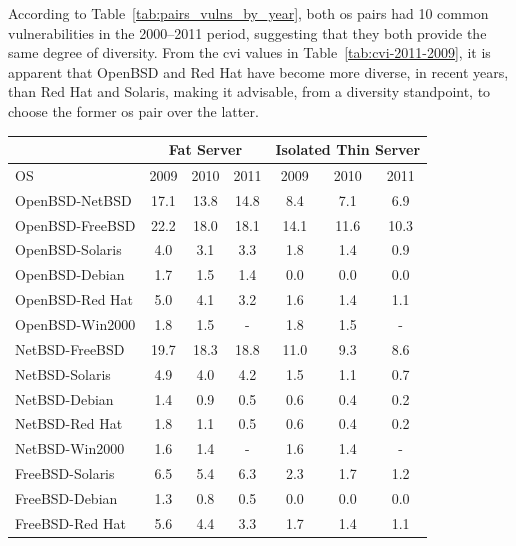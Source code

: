 According to Table~\ref{tab:pairs_vulns_by_year}, both \gls{os} pairs had 10 common vulnerabilities in the 2000--2011 period, suggesting that they both provide the same degree of diversity. 
From the \gls{cvi} values in Table~\ref{tab:cvi-2011-2009}, it is apparent that OpenBSD and Red Hat have become more diverse, in recent years, than Red Hat and Solaris, making it advisable, from a diversity standpoint, to choose the former \gls{os} pair over the latter.

\begin{table}[!ht]
\begin{center}
{\scriptsize
\begin{tabular}{|l|c c c|| c c c |}
\cline{2-7}
\multicolumn{1}{c}{} &  \multicolumn{3}{|c||}{\textbf{Fat Server}}  &  \multicolumn{3}{|c|}{\textbf{Isolated Thin Server}} \\ \hline
OS             & 2009 &	2010 & 	2011        & 	2009 & 	2010 & 2011 \\ \hline
OpenBSD-NetBSD  & 17.1 & 13.8 & 14.8        & 8.4 & 7.1 & 6.9   \\
OpenBSD-FreeBSD & 22.2 & 18.0 & 18.1        & 14.1  & 11.6 & 10.3  \\
OpenBSD-Solaris & 4.0 & 3.1 & 3.3           &  1.8 & 1.4 & 0.9  \\
OpenBSD-Debian  & 1.7 & 1.5 & 1.4           &  0.0 & 0.0 & 0.0  \\
OpenBSD-Red Hat & 5.0 & 4.1 & 3.2           &  1.6 & 1.4 & 1.1  \\
OpenBSD-Win2000 & 1.8 & 1.5 & -             &  1.8 & 1.5 & -  \\  \hline
NetBSD-FreeBSD  & 19.7 & 18.3 & 18.8        & 11.0 & 9.3 & 8.6 \\
NetBSD-Solaris  & 4.9 & 4.0 & 4.2           &  1.5 & 1.1 & 0.7  \\
NetBSD-Debian   & 1.4 & 0.9 & 0.5           &  0.6 & 0.4 & 0.2  \\
NetBSD-Red Hat  & 1.8 & 1.1 & 0.5           &  0.6 & 0.4 & 0.2  \\
NetBSD-Win2000  & 1.6 & 1.4 & -             & 1.6 & 1.4 & -   \\ \hline
FreeBSD-Solaris & 6.5 & 5.4 & 6.3           & 2.3 & 1.7 & 1.2  \\
FreeBSD-Debian  & 1.3 & 0.8 & 0.5           & 0.0 & 0.0 & 0.0  \\
FreeBSD-Red Hat & 5.6 & 4.4 & 3.3           & 1.7 & 1.4 & 1.1  \\

\end{tabular}}
\end{center}
\end{table}
